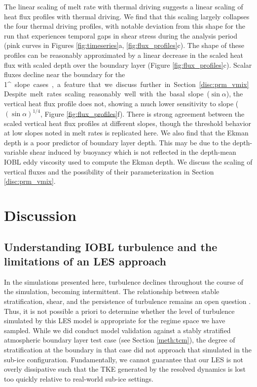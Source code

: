 \documentclass[tc, manuscript]{copernicus}
\begin{document}
The linear scaling of melt rate with thermal driving suggests a linear scaling of heat flux profiles with thermal driving. We find that this scaling largely collapses the four thermal driving profiles, with notable deviation from this shape for the run that experiences temporal gaps in shear stress during the analysis period (pink curves in Figures \ref{fig:timeseries}a, \ref{fig:flux_profiles}c). The shape of these profiles can be reasonably approximated by a linear decrease in the scaled heat flux with scaled depth over the boundary layer (Figure \ref{fig:flux_profiles}c). Scalar fluxes decline near the boundary for the 1\unit{^{\circ}} slope cases, a feature that we discuss further in Section \ref{disc:prm_vmix}. 

Despite melt rates scaling reasonably well with the basal slope ($\sin \alpha$), the vertical heat flux profile does not, showing a much lower sensitivity to slope ($(\sin\alpha)^{1/4}$, Figure \ref{fig:flux_profiles}f). There is strong agreement between the scaled vertical heat flux profiles at different slopes, though the threshold behavior at low slopes noted in melt rates is replicated here. We also find that the Ekman depth is a poor predictor of boundary layer depth. This may be due to the depth-variable shear induced by buoyancy which is not reflected in the depth-mean IOBL eddy viscosity used to compute the Ekman depth. We discuss the scaling of vertical fluxes and the possibility of their parameterization in Section \ref{disc:prm_vmix}.


\section{Discussion}\label{disc}

\subsection{Understanding IOBL turbulence and the limitations of an LES approach} \label{disc:dyn}

In the simulations presented here, turbulence declines throughout the course of the simulation, becoming intermittent. The relationship between stable stratification, shear, and the persistence of turbulence remains an open question \citep{zonta_stably_2018}. Thus, it is not possible a priori to determine whether the level of turbulence simulated by this LES model is appropriate for the regime space we have sampled. While we did conduct model validation against a stably stratified atmospheric boundary layer test case (see Section \ref{meth:tcm}), the degree of stratification at the boundary in that case did not approach that simulated in the sub-ice configuration. Fundamentally, we cannot guarantee that our LES is not overly dissipative such that the TKE generated by the resolved dynamics is lost too quickly relative to real-world sub-ice settings. 
\end{document}
